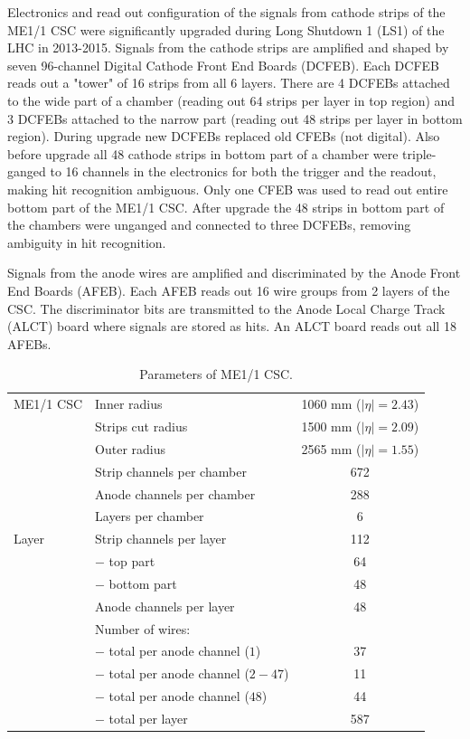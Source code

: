 Electronics and read out configuration of the signals from cathode strips of the ME1/1 CSC were significantly upgraded during Long Shutdown 1 (LS1) of the LHC in 2013-2015. Signals from the cathode strips are amplified and shaped by seven 96-channel Digital Cathode Front End Boards (DCFEB). Each DCFEB reads out a "tower" of 16 strips from all 6 layers. There are 4 DCFEBs attached to the wide part of a chamber (reading out 64 strips per layer in top region) and 3 DCFEBs attached to the narrow part (reading out 48 strips per layer in bottom region). During upgrade new DCFEBs replaced old CFEBs (not digital). Also before upgrade all 48 cathode strips in bottom part of a chamber were triple-ganged to 16 channels in the electronics for both the trigger and the readout, making hit recognition ambiguous. Only one CFEB was used to read out entire bottom part of the ME1/1 CSC. After upgrade the 48 strips in bottom part of the chambers were unganged and connected to three DCFEBs, removing ambiguity in hit recognition.

Signals from the anode wires are amplified and discriminated by the Anode Front End Boards (AFEB). Each AFEB reads out 16 wire groups from 2 layers of the CSC. The discriminator bits are transmitted to the Anode Local Charge Track (ALCT) board where signals are stored as hits. An ALCT board reads out all 18 AFEBs.

\begin{table}[h]
\caption{Parameters of ME1/1 CSC.}
\label{tab:me11}
\begin{center}
\begin{tabular}{|l|l|c|}
\hline
ME1/1 CSC & Inner radius   & 1060 mm ($|\eta|=2.43$) \\
          & Strips cut radius & 1500 mm ($|\eta|=2.09$) \\
          & Outer radius & 2565 mm ($|\eta|=1.55$) \\
          & Strip channels per chamber & 672 \\
          & Anode channels per chamber & 288 \\
          & Layers per chamber & 6 \\ \hline
Layer     & Strip channels per layer & 112 \\
          & $-$ top part & 64  \\
          & $-$ bottom part & 48  \\
          & Anode channels per layer & 48 \\
          & Number of wires: &  \\
          & $-$ total per anode channel ($1$) & 37 \\
          & $-$ total per anode channel ($2-47$) & 11 \\
          & $-$ total per anode channel ($48$) & 44 \\
          & $-$ total per layer & 587 \\
\hline
\end{tabular}
\end{center}
\end{table}

